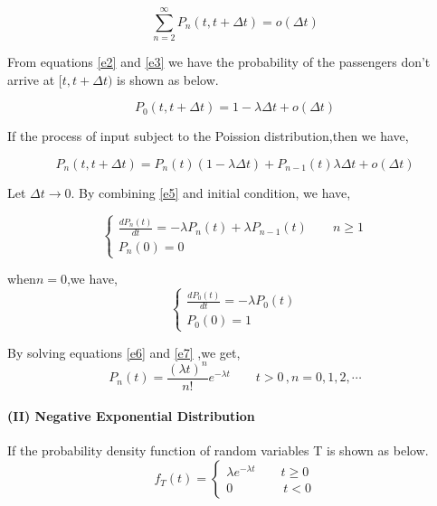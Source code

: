 \documentclass{mcmthesis}
\begin{document}
\begin{equation}  
\sum\limits_{n=2}^\infty P_n(t,t+\Delta t)=o(\Delta t)   \label{e3}
\end{equation}

From equations \eqref{e2} and  \eqref{e3} we have the probability of the  passengers don't arrive at $[t,t+\Delta t)$ is shown as below.

\begin{equation}
P_0(t,t+\Delta t)=1-\lambda \Delta t+o(\Delta t)
\end{equation}


If the process of input subject to the Poission distribution,then we have,

\begin{equation}
P_n(t,t+\Delta t)=P_n(t)(1-\lambda \Delta t)+P_{n-1}(t)\lambda \Delta t+o(\Delta t) \label{e5}
\end{equation}

Let  $\Delta t \rightarrow 0$. By combining \eqref{e5} and initial condition, we have,

\begin{equation}    \label{e6}
\left\{
       \begin{array}{lr}
           \frac {d P_n(t)}{d t}=-\lambda P_n(t)+\lambda P_{n-1}(t)\qquad n\geqslant 1\\
            P_n(0)=0
        \end{array}
\right.
\end{equation}

when$n=0$,we have,
\begin{equation}    \label{e7}
\left\{
       \begin{array}{lr}
           \frac {d P_0(t)}{d t}=-\lambda P_0(t)\\
            P_0(0)=1
        \end{array}
\right.
\end{equation}


By solving equations \eqref{e6} and \eqref{e7} ,we get,
\begin{equation}
 P_n(t)=\frac{(\lambda t)^n}{n!} e^{-\lambda t}\qquad t>0\, , n=0,1,2,\cdots
\end{equation}


\paragraph{(II) Negative Exponential Distribution}%
If the probability density function of random variables T is shown as below.
\begin{equation}    
f_T(t)=\left  \{
       \begin{array}{lr}
           \lambda e^{-\lambda t}\qquad t\geqslant 0\\
            0\qquad\qquad t<0
        \end{array}
\right.
\end{equation}
\end{document}
